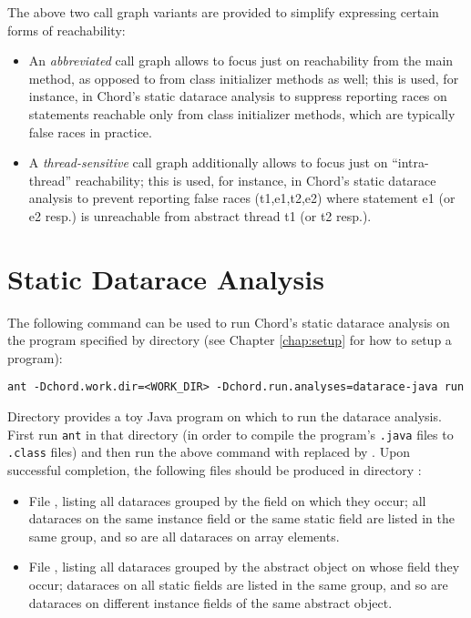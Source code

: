 The above two call graph variants are provided to simplify expressing
certain forms of reachability:
\begin{itemize}
\item
An {\it abbreviated} call graph allows to focus just on reachability
from the main method, as opposed to from class initializer methods as well;
this is used, for instance, in Chord's static datarace analysis to
suppress reporting races on statements reachable only from class initializer
methods, which are typically false races in practice.
\item
A {\it thread-sensitive} call graph additionally allows to focus just on
``intra-thread'' reachability; this is used, for instance, in Chord's static datarace
analysis to prevent reporting false races (t1,e1,t2,e2)
where statement e1 (or e2 resp.) is unreachable from abstract thread
t1 (or t2 resp.).
\end{itemize}

\section{Static Datarace Analysis}

The following command can be used to run Chord's static datarace analysis on the
program specified by directory  (see Chapter \ref{chap:setup}
for how to setup a program):

\begin{framed}
\begin{verbatim}
ant -Dchord.work.dir=<WORK_DIR> -Dchord.run.analyses=datarace-java run
\end{verbatim}
\end{framed}

Directory  provides a toy Java program on which to
run the datarace analysis.  First run {\tt ant} in that directory (in order to
compile the program's {\tt .java} files to {\tt .class} files) and then run the
above command with  replaced by .
Upon successful completion, the following files should be produced in directory
:

\begin{itemize}
\item
File , listing all dataraces grouped by the field on
which they occur; all dataraces on the same instance field or the same static
field are listed in the same group, and so are all dataraces on array elements.
\item
File , listing all dataraces grouped by the abstract
object on whose field they occur; dataraces on all static fields are listed in
the same group, and so are dataraces on different instance fields of the same
abstract object.
\end{itemize}

